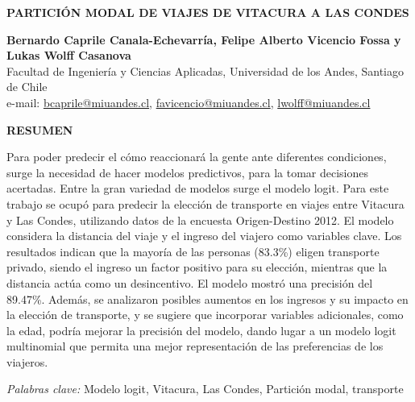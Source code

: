 \documentclass[letterpaper,12pt]{article}
\begin{document}
\begin{titlepage}
    \begin{center}
        
    
    \vspace*{1cm}


    \textbf{\Large PARTICIÓN MODAL DE VIAJES DE VITACURA A LAS CONDES}
  
    \vspace{1cm}
    
    \textbf{Bernardo Caprile Canala-Echevarría, Felipe Alberto Vicencio Fossa y Lukas Wolff Casanova}\\
    Facultad de Ingeniería y Ciencias Aplicadas, Universidad de los Andes, Santiago de Chile\\
    e-mail: \href{mailto:bcaprile@miuandes.cl}{bcaprile@miuandes.cl}, \href{mailto:favicencio@miuandes.cl}{favicencio@miuandes.cl}, \href{mailto:lwolff@miuandes.cl}{lwolff@miuandes.cl}
    
    \vspace{2cm}
    
    \textbf{RESUMEN}
    \end{center}
    \vspace{0.5cm}
    
    Para poder predecir el cómo reaccionará la gente ante diferentes condiciones, surge la necesidad de hacer modelos predictivos, para la tomar decisiones acertadas. Entre la gran variedad de modelos surge el modelo logit. Para este trabajo se ocupó para predecir la elección de transporte en viajes entre Vitacura y Las Condes, utilizando datos de la encuesta Origen-Destino 2012. El modelo considera la distancia del viaje y el ingreso del viajero como variables clave. Los resultados indican que la mayoría de las personas (83.3\%) eligen transporte privado, siendo el ingreso un factor positivo para su elección, mientras que la distancia actúa como un desincentivo. El modelo mostró una precisión del 89.47\%. Además, se analizaron posibles aumentos en los ingresos y su impacto en la elección de transporte, y se sugiere que incorporar variables adicionales, como la edad, podría mejorar la precisión del modelo, dando lugar a un modelo logit multinomial que permita una mejor representación de las preferencias de los viajeros.


    \vspace{1cm}
    
    \textit{Palabras clave:} Modelo logit, Vitacura, Las Condes, Partición modal, transporte
    
\end{titlepage}

\newpage






\end{document}
